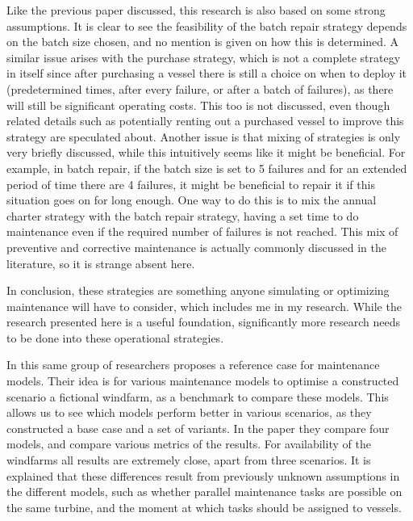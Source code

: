 \documentclass[a4paper,12pt]{article}
\begin{document}
Like the previous paper discussed, this research is also based on some strong assumptions. It is clear to see the feasibility of the batch repair strategy depends on the batch size chosen, and no mention is given on how this is determined. A similar issue arises with the purchase strategy, which is not a complete strategy in itself since after purchasing a vessel there is still a choice on when to deploy it (predetermined times, after every failure, or after a batch of failures), as there will still be significant operating costs. This too is not discussed, even though related details such as potentially renting out a purchased vessel to improve this strategy are speculated about. Another issue is that mixing of strategies is only very briefly discussed, while this intuitively seems like it might be beneficial. For example, in batch repair, if the batch size is set to 5 failures and for an extended period of time there are 4 failures, it might be beneficial to repair it if this situation goes on for long enough. One way to do this is to mix the annual charter strategy with the batch repair strategy, having a set time to do maintenance even if the required number of failures is not reached. This mix of preventive and corrective maintenance is actually commonly discussed in the literature, so it is strange absent here. 

In conclusion, these strategies are something anyone simulating or optimizing maintenance will have to consider, which includes me in my research. While the research presented here is a useful foundation, significantly more research needs to be done into these operational strategies. 

\bigskip

In \cite{dinwoodie2015reference} this same group of researchers proposes a reference case for maintenance models. Their idea is for various maintenance models to optimise a constructed scenario a fictional windfarm, as a benchmark to compare these models. This allows us to see which models perform better in various scenarios, as they constructed a base case and a set of variants. In the paper they compare four models, and compare various metrics of the results. For availability of the windfarms all results are extremely close, apart from three scenarios. It is explained that these differences result from previously unknown assumptions in the different models, such as whether  parallel maintenance tasks are possible on the same turbine, and the moment at which tasks should be assigned to vessels. 
\end{document}

